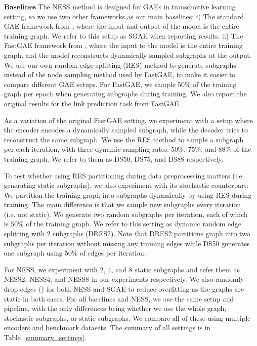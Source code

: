 \documentclass{article}
\begin{document}
\textbf{Baselines} The NESS method is designed for GAEs in transductive learning setting, so we use two other frameworks as our main baselines: i) The standard GAE framework from \citep{kipf2016variational}, where the input and output of the model is the entire training graph. We refer to this setup as SGAE when reporting results. ii) The FastGAE framework from \citep{salha2021fastgae}, where the input to the model is the entire training graph, and the model reconstructs dynamically sampled subgraphs at the output. We use our own random edge splitting (RES) method to generate subgraphs instead of the node sampling method used by FastGAE, to make it easier to compare different GAE setups. For FastGAE, we sample 50\% of the training graph per epoch when generating subgraphs during training. We also report the original results for the link prediction task from FastGAE.

As a variation of the original FastGAE setting, we experiment with a setup where the encoder encodes a dynamically sampled subgraph, while the decoder tries to reconstruct the same subgraph. We use the RES method to sample a subgraph per each iteration, with three dynamic sampling rates: 50\%, 75\%, and 88\% of the training graph. We refer to them as DS50, DS75, and DS88 respectively.

To test whether using RES partitioning during data preprocessing matters (i.e. generating static subgraphs), we also experiment with its stochastic counterpart: We partition the training graph into  subgraphs dynamically by using RES during training. The main difference is that we sample  new subgraphs every iteration (i.e. not static). We generate two random subgraphs per iteration, each of which is 50\% of the training graph. We refer to this setting as dynamic random edge splitting with 2 subgraphs (DRES2). Note that DRES2 partitions graph into two subgraphs per iteration without missing any training edges while DS50 generates one subgraph using 50\% of edges per iteration.

For NESS, we experiment with 2, 4, and 8 static subgraphs and refer them as NESS2, NESS4, and NESS8 in our experiments respectively. We also randomly drop edges () for both NESS and SGAE to reduce overfitting as the graphs are static in both cases. For all baselines and NESS, we use the same setup and pipeline, with the only differences being whether we use the whole graph, stochastic subgraphs, or static subgraphs. We compare all of these using multiple encoders and benchmark datasets. The summary of all settings is in Table~\ref{summary_settings}.
\end{document}
